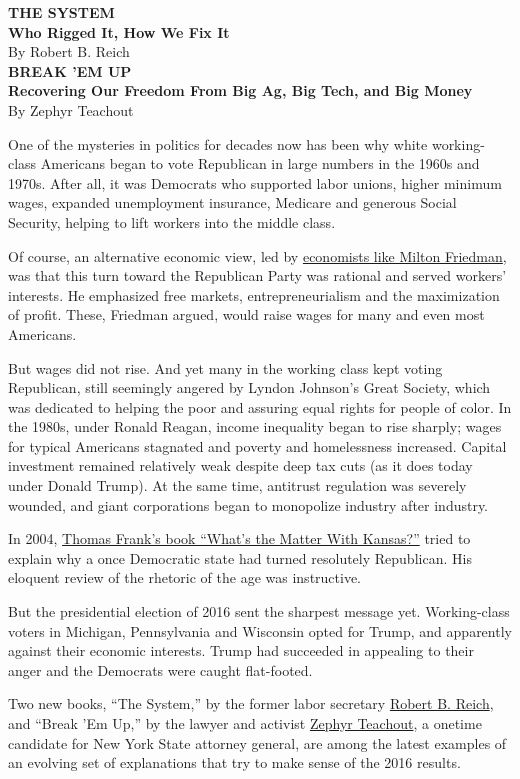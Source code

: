 \textbf{THE SYSTEM}\\
\textbf{Who Rigged It, How We Fix It}\\
By Robert B. Reich\\
\textbf{BREAK 'EM UP}\\
\textbf{Recovering Our Freedom From Big Ag, Big Tech, and Big Money}\\
By Zephyr Teachout

One of the mysteries in politics for decades now has been why white
working-class Americans began to vote Republican in large numbers in the
1960s and 1970s. After all, it was Democrats who supported labor unions,
higher minimum wages, expanded unemployment insurance, Medicare and
generous Social Security, helping to lift workers into the middle class.

Of course, an alternative economic view, led by
\href{https://www.econlib.org/library/Enc/bios/Friedman.html}{economists
like Milton Friedman}, was that this turn toward the Republican Party
was rational and served workers' interests. He emphasized free markets,
entrepreneurialism and the maximization of profit. These, Friedman
argued, would raise wages for many and even most Americans.

But wages did not rise. And yet many in the working class kept voting
Republican, still seemingly angered by Lyndon Johnson's Great Society,
which was dedicated to helping the poor and assuring equal rights for
people of color. In the 1980s, under Ronald Reagan, income inequality
began to rise sharply; wages for typical Americans stagnated and poverty
and homelessness increased. Capital investment remained relatively weak
despite deep tax cuts (as it does today under Donald Trump). At the same
time, antitrust regulation was severely wounded, and giant corporations
began to monopolize industry after industry.

In 2004,
\href{https://www.nytimes.com/2004/06/13/books/heartland-security.html}{Thomas
Frank's book ``What's the Matter With Kansas?''} tried to explain why a
once Democratic state had turned resolutely Republican. His eloquent
review of the rhetoric of the age was instructive.

But the presidential election of 2016 sent the sharpest message yet.
Working-class voters in Michigan, Pennsylvania and Wisconsin opted for
Trump, and apparently against their economic interests. Trump had
succeeded in appealing to their anger and the Democrats were caught
flat-footed.

Two new books, ``The System,'' by the former labor secretary
\href{https://robertreich.org}{Robert B. Reich}, and ``Break 'Em Up,''
by the lawyer and activist
\href{https://www.chicagotribune.com/opinion/ct-nyt-zephyr-teachout-joe-biden-corrupt-op-ed-20200125-ny7pqixehrc7jbjdgts7pzny2u-story.html}{Zephyr
Teachout}, a onetime candidate for New York State attorney general, are
among the latest examples of an evolving set of explanations that try to
make sense of the 2016 results.

